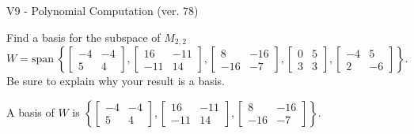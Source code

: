 \begin{exercise}
  \begin{exerciseTitle}V9 - Polynomial Computation (ver. 78)\end{exerciseTitle}
  \begin{exerciseStatement}
    Find a basis for the subspace of \(M_{2,2}\) 
\[W=\mathrm{span}\ \left\{\left[\begin{array}{cc}
-4 & -4 \\
5 & 4
\end{array}\right] , \left[\begin{array}{cc}
16 & -11 \\
-11 & 14
\end{array}\right] , \left[\begin{array}{cc}
8 & -16 \\
-16 & -7
\end{array}\right] , \left[\begin{array}{cc}
0 & 5 \\
3 & 3
\end{array}\right] , \left[\begin{array}{cc}
-4 & 5 \\
2 & -6
\end{array}\right]\right\}.\]
 Be sure to explain why your result is a basis.


  \end{exerciseStatement}
  \begin{exerciseAnswer}
   A basis of \(W\) is  \(\left\{\left[\begin{array}{cc}
-4 & -4 \\
5 & 4
\end{array}\right] , \left[\begin{array}{cc}
16 & -11 \\
-11 & 14
\end{array}\right] , \left[\begin{array}{cc}
8 & -16 \\
-16 & -7
\end{array}\right]\right\}\).
  


  \end{exerciseAnswer}
\end{exercise}